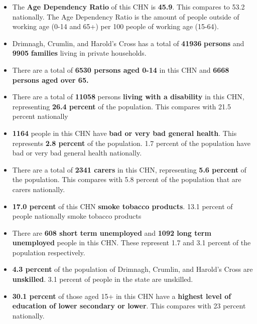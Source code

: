 \documentclass{article}
\begin{document}
\begin{itemize}

\item The \textbf{Age Dependency Ratio} of this CHN is  \textbf{45.9}. This compares to 53.2 nationally. The Age Dependency Ratio is the amount of people outside of working age (0-14 and 65+) per 100 people of working age (15-64). 

\item Drimnagh, Crumlin, and Harold's Cross has a total of \textbf{\num{41936}} \textbf{persons} and  \textbf{\num{9905}} \textbf{families} living in private households.

\item There are a total of \textbf{\num{6530} persons aged 0-14} in this CHN and \textbf{\num{6668} persons aged over 65.} 

\item There are a total of \textbf{\num{11058}} persons \textbf{living with a disability} in this CHN, representing \textbf{26.4 percent} of the population. This compares with  21.5 percent nationally

\item \textbf{\num{1164}} people in this CHN have \textbf{bad or very bad general health}. This represents \textbf{2.8 percent} of the population. 1.7 percent of the population have bad or very bad general health nationally. 

\item There are a total of \textbf{\num{2341} carers} in this CHN, representing \textbf{5.6 percent} of the population. This compares with 5.8 percent of the population that are carers nationally. 

\item \textbf{17.0 percent} of this CHN \textbf{smoke tobacco products}. 13.1 percent of people nationally smoke tobacco products

\item There are \textbf{\num{608} short term unemployed} and \textbf{\num{1092} long term unemployed} people in this CHN. These represent 1.7 and 3.1 percent of the population respectively.

\item  \textbf{4.3 percent} of the population of Drimnagh, Crumlin, and Harold's Cross are \textbf{unskilled}. 3.1 percent of people in the state are unskilled.

\item \textbf{30.1 percent} of those aged 15+ in this CHN have a \textbf{highest level of education of lower secondary or lower}. This compares with 23 percent nationally. 


\end{itemize}
\end{document}
